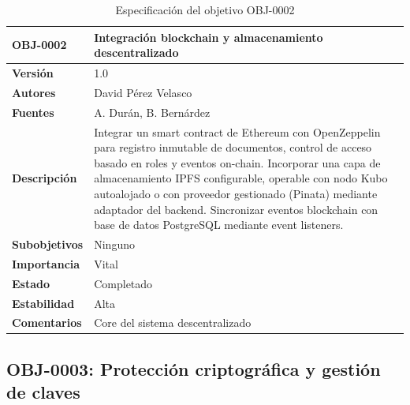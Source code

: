 \documentclass[11pt, a4paper]{article}
\begin{document}
\begin{table}[H]
    \centering
    \small
    \begin{tabular}{|p{4cm}|p{10cm}|}
    \hline
    \textbf{OBJ-0002} & Integración blockchain y almacenamiento descentralizado \\
    \hline
    \textbf{Versión} & 1.0 \\
    \hline
    \textbf{Autores} & David Pérez Velasco \\
    \hline
    \textbf{Fuentes} & A. Durán, B. Bernárdez \\
    \hline
    \textbf{Descripción} & Integrar un smart contract de Ethereum con OpenZeppelin para registro inmutable de documentos, control de acceso basado en roles y eventos on-chain. Incorporar una capa de almacenamiento IPFS configurable, operable con nodo Kubo autoalojado o con proveedor gestionado (Pinata) mediante adaptador del backend. Sincronizar eventos blockchain con base de datos PostgreSQL mediante event listeners. \\
    \hline
    \textbf{Subobjetivos} & Ninguno \\
    \hline
    \textbf{Importancia} & Vital \\
    \hline
    \textbf{Estado} & Completado \\
    \hline
    \textbf{Estabilidad} & Alta \\
    \hline
    \textbf{Comentarios} & Core del sistema descentralizado \\
    \hline
    \end{tabular}
    \caption{Especificación del objetivo OBJ-0002}
\end{table}

\subsection{OBJ-0003: Protección criptográfica y gestión de claves}
\end{document}
